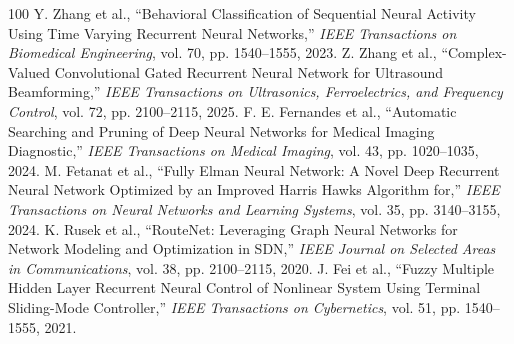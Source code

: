\documentclass[journal]{IEEEtran}
\begin{document}
\begin{thebibliography}{100}
 Y. Zhang et al., ``Behavioral Classification of Sequential Neural Activity Using Time Varying Recurrent Neural Networks,'' \emph{IEEE Transactions on Biomedical Engineering}, vol. 70, pp. 1540--1555, 2023.
 Z. Zhang et al., ``Complex-Valued Convolutional Gated Recurrent Neural Network for Ultrasound Beamforming,'' \emph{IEEE Transactions on Ultrasonics, Ferroelectrics, and Frequency Control}, vol. 72, pp. 2100--2115, 2025.
 F. E. Fernandes et al., ``Automatic Searching and Pruning of Deep Neural Networks for Medical Imaging Diagnostic,'' \emph{IEEE Transactions on Medical Imaging}, vol. 43, pp. 1020--1035, 2024.
 M. Fetanat et al., ``Fully Elman Neural Network: A Novel Deep Recurrent Neural Network Optimized by an Improved Harris Hawks Algorithm for,'' \emph{IEEE Transactions on Neural Networks and Learning Systems}, vol. 35, pp. 3140--3155, 2024.
 K. Rusek et al., ``RouteNet: Leveraging Graph Neural Networks for Network Modeling and Optimization in SDN,'' \emph{IEEE Journal on Selected Areas in Communications}, vol. 38, pp. 2100--2115, 2020.
 J. Fei et al., ``Fuzzy Multiple Hidden Layer Recurrent Neural Control of Nonlinear System Using Terminal Sliding-Mode Controller,'' \emph{IEEE Transactions on Cybernetics}, vol. 51, pp. 1540--1555, 2021.

\end{thebibliography}
\end{document}
